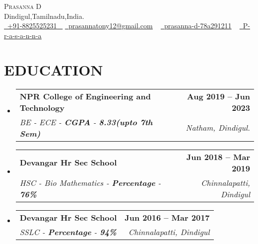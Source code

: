 \documentclass[letterpaper,11pt]{article}
\makeatletter
\newcommand{\resumeSubheading}[4]{
  \vspace{-2pt}\item
    \begin{tabular*}{1.0\textwidth}[t]{l@{\extracolsep{\fill}}r}
      \textbf{\large#1} & \textbf{\small #2} \\
      \textit{\large#3} & \textit{\small #4} \\
      
    \end{tabular*}\vspace{-7pt}
}
\newcommand{\resumeSubHeadingListStart}{\begin{itemize}[leftmargin=0.0in, label={}]}
\newcommand{\resumeSubHeadingListEnd}{\end{itemize}}
\makeatother
\begin{document}


\begin{center}
    {\Huge \scshape Prasanna D} \\ \vspace{1pt}
    Dindigul,Tamilnadu,India. \\ \vspace{1pt}
    \small \href{tel:+918825525231}{ \raisebox{-0.1\height}\faPhone\ \underline{+91-8825525231} ~} \href{mailto:prasannatony12@gmail.com}{\raisebox{-0.2\height}\faEnvelope\  \underline{prasannatony12@gmail.com}} ~ 
    \href{https://linkedin.com/in/prasanna-d-78a291211}{\raisebox{-0.2\height}\faLinkedinSquare\ \underline{prasanna-d-78a291211}}  ~
    \href{https://github.com/P-r-a-s-a-n-n-a}{\raisebox{-0.2\height}\faGithub\ \underline{P-r-a-s-a-n-n-a}} ~
\end{center}


\section{EDUCATION}
  \resumeSubHeadingListStart
    \resumeSubheading
      {NPR College of Engineering and Technology}{Aug 2019 -- Jun 2023}
      {BE - ECE  - \textbf{CGPA} - \textbf{8.33(upto 7th Sem)}}{Natham, Dindigul.}
     
  \resumeSubHeadingListEnd
  \vspace{-12pt}
  
  \resumeSubHeadingListStart
    \resumeSubheading
      {Devangar Hr Sec School}{Jun 2018 -- Mar 2019}
      {HSC -   Bio Mathematics - \textbf{Percentage} - \textbf{76\%}}{Chinnalapatti, Dindigul}
  \resumeSubHeadingListEnd
  \vspace{-10pt}

   \resumeSubHeadingListStart
    \resumeSubheading
      {Devangar Hr Sec School}{Jun 2016 -- Mar 2017}
      {SSLC - \textbf{Percentage} - \textbf{94\%}}{Chinnalapatti, Dindigul}
  \resumeSubHeadingListEnd

\end{document}
